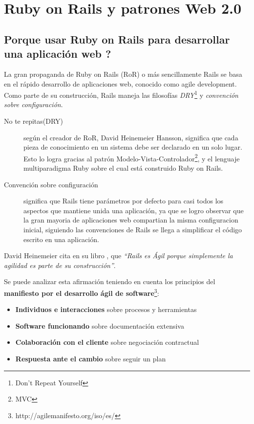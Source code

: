 \chapter{Ruby on Rails y patrones Web 2.0} %
\label{cha:ruby_on_rails_y_patrones_web_2_0}

  \section{Porque usar Ruby on Rails para desarrollar una aplicación web ?} %
  \label{sec:porque_usar_ruby_on_rails_para_desarrollar_una_aplicacion_web}

    La gran propaganda de Ruby on Rails (RoR) o más sencillamente Rails
    se basa en el rápido desarrollo de aplicaciones web, conocido como agile development.
    Como parte de su construcci\'on, Rails maneja las filosofías \emph{DRY}\footnote{Don’t Repeat Yourself} y \emph{convención sobre configuración}. 

    \begin{description}
      \item[No te repitas(DRY)] según el creador de RoR, \mbox{David} \mbox{Heinemeier} Hansson, 
      significa que cada pieza de conocimiento en un sistema 
      debe ser declarado en un solo lugar.\cite{awdr4e} 
      Esto lo logra gracias al patrón Modelo-Vista-Controlador\footnote{MVC}, 
      y el lenguaje multiparadigma Ruby sobre el cual está construido Ruby on Rails.
      
      \item[Convención sobre configuración] significa que Rails tiene parámetros por 
      defecto para casi todos los aspectos que mantiene unida una aplicación, ya que se logro
      observar que la gran mayoria de aplicaciones web compartian la misma configuracion inicial,
      siguiendo  las convenciones de Rails se llega a simplificar el código escrito en una aplicación.
    \end{description}


    David Heinemeier cita en su libro \cite{awdr4e}, que \emph{“Rails es Ágil porque 
    simplemente la agilidad es parte de su construcción”}.

    Se puede analizar esta afirmaci\'on teniendo en cuenta los principios del
     \textbf{manifiesto por el desarrollo ágil de software}\footnote{http://agilemanifesto.org/iso/es/}:
    \begin{itemize}
      \item \textbf{Individuos e interacciones} sobre procesos y herramientas
      \item \textbf{Software funcionando} sobre documentación extensiva
      \item \textbf{Colaboración con el cliente} sobre negociación contractual
      \item \textbf{Respuesta ante el cambio} sobre seguir un plan
    \end{itemize}
    
